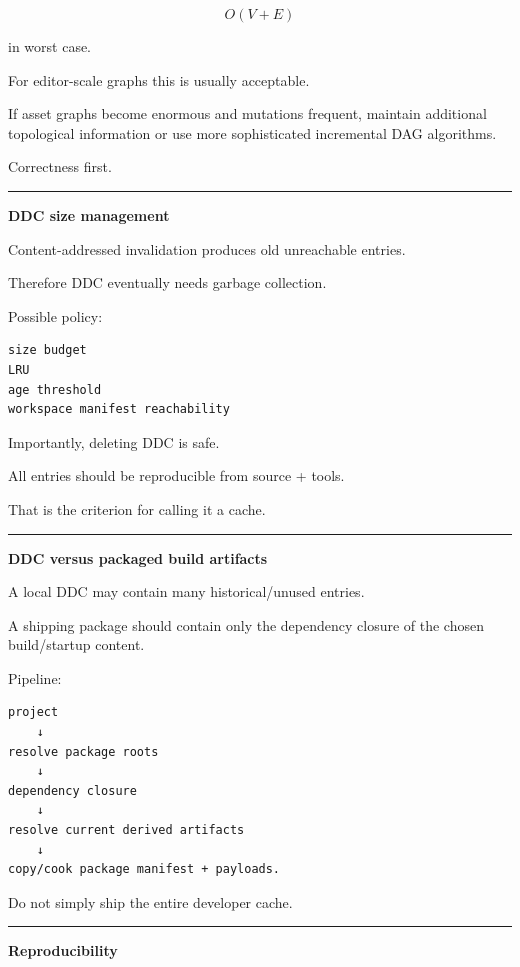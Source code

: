 \[
O(V+E)
\]

in worst case.

For editor-scale graphs this is usually acceptable.

If asset graphs become enormous and mutations frequent, maintain additional topological information or use more sophisticated incremental DAG algorithms.

Correctness first.

\begin{center}\rule{0.5\linewidth}{0.5pt}\end{center}

\textbf{DDC size management}

Content-addressed invalidation produces old unreachable entries.

Therefore DDC eventually needs garbage collection.

Possible policy:

\begin{verbatim}
size budget
LRU
age threshold
workspace manifest reachability
\end{verbatim}

Importantly, deleting DDC is safe.

All entries should be reproducible from source + tools.

That is the criterion for calling it a cache.

\begin{center}\rule{0.5\linewidth}{0.5pt}\end{center}

\textbf{DDC versus packaged build artifacts}

A local DDC may contain many historical/unused entries.

A shipping package should contain only the dependency closure of the chosen build/startup content.

Pipeline:

\begin{verbatim}
project
    ↓
resolve package roots
    ↓
dependency closure
    ↓
resolve current derived artifacts
    ↓
copy/cook package manifest + payloads.
\end{verbatim}

Do not simply ship the entire developer cache.

\begin{center}\rule{0.5\linewidth}{0.5pt}\end{center}

\textbf{Reproducibility}

